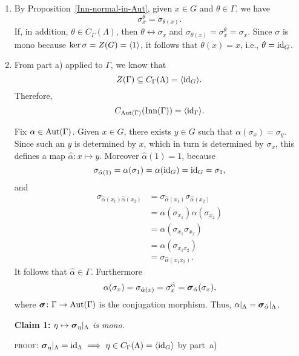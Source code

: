 \begin{solution}
\begin{enumerate}[\rm a)]
    \item By Proposition~\ref{Inn-normal-in-Aut}, given $x\in G$ and $\theta\in\Gamma$, we have 
    $$
        \sigma_x^\theta=\sigma_{\theta(x)}.
    $$
    If, in addition, $\theta\in C_\Gamma(\Lambda)$, then $\theta\leftrightarrow\sigma_x$ and $\sigma_{\theta(x)}=\sigma_x^\theta=\sigma_x$. Since $\sigma$ is mono because $\ker\sigma=Z(G)=\langle1\rangle$, it follows that $\theta(x)=x$, i.e., $\theta=\operatorname{id}_G$.

    \item From part a) applied to $\Gamma$, we know that
    $$
        Z(\Gamma)\subseteq C_\Gamma(\Lambda) = \langle\operatorname{id}_G\rangle.
    $$
    Therefore,
    \begin{equation}\label{eq-7.1}
        C_{{\rm Aut}(\Gamma)}({\rm Inn}(\Gamma))=\langle\operatorname{id}_\Gamma\rangle.
    \end{equation}
    
    Fix $\alpha\in{\rm Aut}(\Gamma)$. Given $x\in G$, there exists $y\in G$ such that $\alpha(\sigma_x)=\sigma_y$. Since such an $y$ is determined by $x$, which in turn is determined by $\sigma_x$, this defines a map $\hat\alpha\colon x\mapsto y$. Moreover $\hat\alpha(1)=1$, because 
    $$
        \sigma_{\hat\alpha(1)}=\alpha(\sigma_1)=\alpha(\operatorname{id}_G)=\operatorname{id}_G=\sigma_1,
    $$
    and
    \begin{align*}
            \sigma_{\hat\alpha(x_1)\hat\alpha(x_2)} &= \sigma_{\hat\alpha(x_1)}\sigma_{\hat\alpha(x_2)}\\
            &= \alpha(\sigma_{x_1})\alpha(\sigma_{x_2})\\
            &= \alpha(\sigma_{x_1}\sigma_{x_2})\\
            & =\alpha(\sigma_{x_1x_2})\\
            &= \sigma_{\hat\alpha(x_1x_2)}.
    \end{align*}
    It follows that $\hat\alpha\in\Gamma$. Furthermore
    $$
        \alpha(\sigma_x)=\sigma_{\hat\alpha(x)}=\sigma_x^{\hat\alpha} = \textrm{\boldmath$\sigma$}_{\hat\alpha}(\sigma_x),
    $$
    where $\textrm{\boldmath$\sigma$}\colon\Gamma\to{\rm Aut}(\Gamma)$ is the conjugation morphism. Thus, $\alpha|_\Lambda=\textrm{\boldmath$\sigma$}_{\hat\alpha}|_\Lambda$.

   \textbf{Claim 1:} \textit{$\eta\mapsto\textrm{\boldmath$\sigma$}_\eta|_\Lambda$ is mono.}

    {\small\textsc{proof:} $\textrm{\boldmath$\sigma$}_\eta|_\Lambda=\operatorname{id}_\Lambda\implies
        \eta\in C_\Gamma(\Lambda)=\langle\operatorname{id}_G\rangle$ by part~a)}
   

\end{enumerate}
\end{solution}
